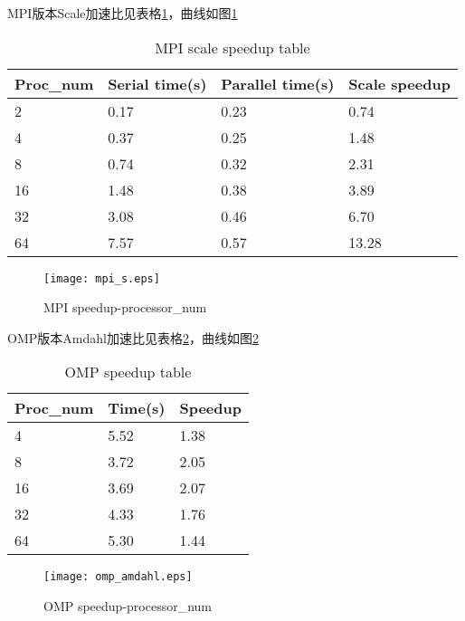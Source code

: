 \documentclass{ctexart}
\begin{document}
MPI版本Scale加速比见表格\ref{tab:mpi_s}，曲线如图\ref{fig:mpi_s}
\begin{table}[]
    \centering
    \caption{MPI scale speedup table} 
    \label{tab:mpi_s} 
    \begin{tabular}{@{}llll@{}}
        \toprule
        Proc\_num & Serial time(s) & Parallel time(s) & Scale speedup \\ \midrule
        2         & 0.17           & 0.23             & 0.74          \\
        4         & 0.37           & 0.25             & 1.48          \\
        8         & 0.74           & 0.32             & 2.31          \\
        16        & 1.48           & 0.38             & 3.89          \\
        32        & 3.08           & 0.46             & 6.70          \\
        64        & 7.57           & 0.57             & 13.28         \\ \bottomrule
    \end{tabular}
\end{table}
\begin{figure}
    \centering 
    \texttt{[image: mpi\_s.eps]} 
    \caption{MPI speedup-processor\_num} 
    \label{fig:mpi_s} 
\end{figure}


OMP版本Amdahl加速比见表格\ref{tab:omp_a}，曲线如图\ref{fig:omp_a}
\begin{table}[]
    \centering
    \caption{OMP speedup table} 
    \label{tab:omp_a} 
    \begin{tabular}{@{}lll@{}}
        \toprule
        Proc\_num & Time(s) & Speedup \\ \midrule
        4         & 5.52    & 1.38    \\
        8         & 3.72    & 2.05    \\
        16        & 3.69    & 2.07    \\
        32        & 4.33    & 1.76    \\
        64        & 5.30    & 1.44   \\ \bottomrule
    \end{tabular}
\end{table}
\begin{figure}
    \centering 
    \texttt{[image: omp\_amdahl.eps]} 
    \caption{OMP speedup-processor\_num} 
    \label{fig:omp_a} 
\end{figure}
\end{document}
